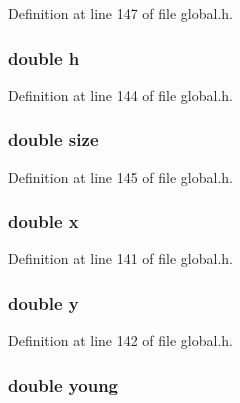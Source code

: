 Definition at line 147 of file global.\-h.

\hypertarget{structpartData_a8ee9be1b5aa75abae556de3088cba6d9}{
\subsubsection[{h}]{\setlength{\rightskip}{0pt plus 5cm}double h}}\label{structpartData_a8ee9be1b5aa75abae556de3088cba6d9}


Definition at line 144 of file global.\-h.

\hypertarget{structpartData_aba3c5d750d5dbd6e86c11ecaca62885e}{
\subsubsection[{size}]{\setlength{\rightskip}{0pt plus 5cm}double size}}\label{structpartData_aba3c5d750d5dbd6e86c11ecaca62885e}


Definition at line 145 of file global.\-h.

\hypertarget{structpartData_af88b946fb90d5f08b5fb740c70e98c10}{
\subsubsection[{x}]{\setlength{\rightskip}{0pt plus 5cm}double x}}\label{structpartData_af88b946fb90d5f08b5fb740c70e98c10}


Definition at line 141 of file global.\-h.

\hypertarget{structpartData_ab927965981178aa1fba979a37168db2a}{
\subsubsection[{y}]{\setlength{\rightskip}{0pt plus 5cm}double y}}\label{structpartData_ab927965981178aa1fba979a37168db2a}


Definition at line 142 of file global.\-h.

\hypertarget{structpartData_a47ec3689b1fd89ba8e75d9a9975ba63f}{
\subsubsection[{young}]{\setlength{\rightskip}{0pt plus 5cm}double young}}\label{structpartData_a47ec3689b1fd89ba8e75d9a9975ba63f}



